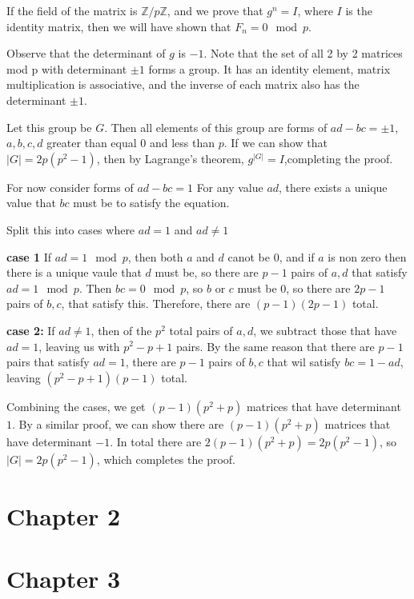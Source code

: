 \documentclass[11pt]{article}
\begin{document}
If the field of the matrix is \(\mathbb{Z} / p \mathbb{Z}\), and we prove
that \(g^n = I\), where \(I\) is the identity matrix, then we will have shown that
\(F_n = 0 \mod p\).


Observe that the determinant of \(g\)  is \(-1\). Note that the set of all 2 by 2 matrices
mod p
with determinant \(\pm 1\) forms a group. It has an identity element,
matrix multiplication is associative, and the inverse of each matrix
also has the determinant \(\pm 1\).

Let this group be \(G\).  Then all elements of this group are forms of \(ad - bc = \pm 1\),
\(a, b, c, d\) greater than equal \(0\) and  less than \(p\). If we can show that
\(|G| = 2p(p^2 - 1)\), then by Lagrange's theorem, \(g^{|G|} = I\),completing the proof.


For now consider forms of \(ad - bc = 1\)
For any value \(ad\), there exists a unique value that \(bc\) must be to
satisfy the equation.

Split this into cases where \(ad = 1\) and \(ad \ne 1\)

\textbf{case 1}
If \(ad = 1 \mod p\), then both \(a\) and \(d\) canot be \(0\), and if \(a\) is non zero
then there is a unique vaule that \(d\) must be, so there are \(p - 1\) pairs of \(a, d\)
that satisfy \(ad = 1 \mod p\).  Then \(bc = 0 \mod p\), so \(b\) or \(c\) must be \(0\), so
there are \(2p - 1\) pairs of \(b, c\), that satisfy this.  Therefore, there are
\((p - 1)(2p - 1)\) total.

\textbf{case 2:}
If \(ad \ne 1\), then of the \(p^2\) total pairs of \(a, d\), we subtract those that have
\(ad = 1\), leaving us with \(p^2 - p + 1\) pairs.  By the same reason that
there are \(p - 1\) pairs that satisfy \(ad = 1\), there are \(p -1\) pairs of \(b, c\)
that wil satisfy \(bc = 1 - ad\), leaving \((p^2 - p + 1)(p - 1)\) total.

Combining the cases, we get \((p - 1)(p^2 + p)\) matrices that have determinant \(1\).
By a similar proof, we can show there are \((p - 1)(p^2 + p)\) matrices that have
determinant \(-1\).  In total there are \(2(p-1)(p^2 + p) = 2p(p^2 - 1)\), so
\(|G| = 2p(p^2 - 1)\), which completes the proof.

\section{Chapter 2}
\label{sec:orgcb13248}
\section{Chapter 3}
\label{sec:orgf96a046}
\end{document}
